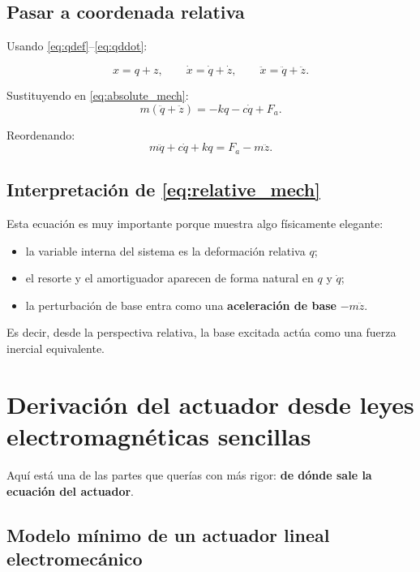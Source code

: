 \documentclass[11pt]{article}
\begin{document}
\subsection{Pasar a coordenada relativa}

Usando \eqref{eq:qdef}--\eqref{eq:qddot}:

\[
x = q+z,\qquad
\dot{x}=\dot{q}+\dot{z},\qquad
\ddot{x}=\ddot{q}+\ddot{z}.
\]

Sustituyendo en \eqref{eq:absolute_mech}:
\begin{equation}
m(\ddot{q}+\ddot{z}) = -kq - c\dot{q} + F_a.
\end{equation}

Reordenando:
\begin{equation}
m\ddot{q} + c\dot{q} + kq = F_a - m\ddot{z}.
\label{eq:relative_mech}
\end{equation}

\subsection{Interpretaci\'on de \eqref{eq:relative_mech}}

Esta ecuaci\'on es muy importante porque muestra algo f\'isicamente elegante:

\begin{itemize}[leftmargin=1.2cm]
\item la variable interna del sistema es la deformaci\'on relativa $q$;
\item el resorte y el amortiguador aparecen de forma natural en $q$ y $\dot q$;
\item la perturbaci\'on de base entra como una \textbf{aceleraci\'on de base} $-\!m\ddot z$.
\end{itemize}

Es decir, desde la perspectiva relativa, la base excitada act\'ua como una fuerza inercial equivalente.

\section{Derivaci\'on del actuador desde leyes electromagn\'eticas sencillas}

Aqu\'i est\'a una de las partes que quer\'ias con m\'as rigor: \textbf{de d\'onde sale la ecuaci\'on del actuador}.

\subsection{Modelo m\'inimo de un actuador lineal electromec\'anico}
\end{document}
